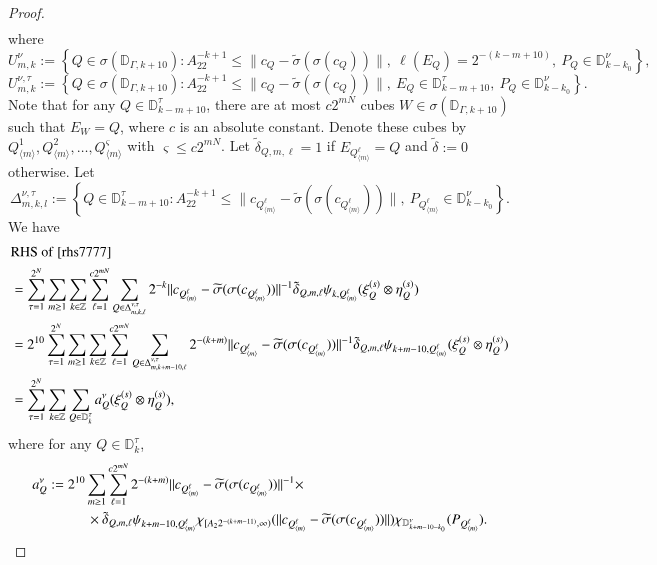 \documentclass[12pt]{amsart}
\begin{document}
\begin{proof}
\begin{align}
\end{align}
where
$$U_{m,k}^\nu:=\left\{Q\in\sigma(\mathbb{D}_{\Gamma,k+10}):A_22^{-k+1}\leq \|c_Q-\widetilde{\sigma}(\sigma(c_Q))\|,\ \ell(E_Q)=2^{-(k-m+10)},\ P_Q\in \mathbb{D}_{k-k_0}^\nu\right\},$$
$$U_{m,k}^{\nu,\tau}:=\left\{Q\in\sigma(\mathbb{D}_{\Gamma,k+10}):A_22^{-k+1}\leq \|c_Q-\widetilde{\sigma}(\sigma(c_Q))\|,\ E_Q\in\mathbb{D}^\tau_{k-m+10},\ P_Q\in \mathbb{D}_{k-k_0}^\nu\right\}.$$
Note that for any $Q\in\mathbb{D}^\tau_{k-m+10}$, there are at most $c2^{mN}$ cubes $W\in\sigma(\mathbb{D}_{\Gamma,k+10})$ such that $E_W=Q$, where $c$ is an absolute constant. Denote these cubes by $Q_{\langle m \rangle}^1, Q_{\langle m\rangle}^2,\ldots,Q_{\langle m\rangle}^\varsigma$ with $\varsigma\leq c2^{mN}$. Let $\tilde{\delta}_{Q,m,\ell}=1$ if $E_{Q_{\langle m\rangle}^\ell}=Q$ and $\tilde{\delta}:=0$ otherwise. Let
$$\Delta_{m,k,l}^{\nu,\tau}:=\left\{Q\in \mathbb{D}_{k-m+10}^\tau: A_22^{-k+1}\leq \|c_{Q_{\langle m\rangle}^\ell}-\widetilde{\sigma}(\sigma(c_{Q_{\langle m\rangle}^\ell}))\|,\ P_{Q_{\langle m\rangle}^\ell}\in \mathbb{D}_{k-k_0}^\nu \right\}.$$
We have
\begin{align}\label{rhs8888}
&{\rm RHS}\ {\rm of}\ \eqref{rhs7777}\nonumber\\
&=\sum_{\tau=1}^{2^N}\sum_{m\geq 1}\sum_{k\in\mathbb{Z}}\sum_{\ell=1}^{c2^{mN}}\sum_{Q\in\Delta_{m,k,\ell}^{\nu,\tau}}2^{-k}\|c_{Q_{\langle m\rangle}^\ell}-\widetilde{\sigma}(\sigma(c_{Q_{\langle m\rangle}^\ell}))\|^{-1}\tilde{\delta}_{Q,m,\ell}\psi_{k,Q_{\langle m \rangle}^\ell}(\xi_{Q}^{(s)}\otimes \eta_{Q}^{(s)})\nonumber\\
&=2^{10}\sum_{\tau=1}^{2^N}\sum_{m\geq 1}\sum_{k\in\mathbb{Z}}\sum_{\ell=1}^{c2^{mN}}\sum_{Q\in\Delta_{m,k+m-10,\ell}^{\nu,\tau}}2^{-(k+m)}\|c_{Q_{\langle m\rangle}^\ell}-\widetilde{\sigma}(\sigma(c_{Q_{\langle m\rangle}^\ell}))\|^{-1}\tilde{\delta}_{Q,m,\ell}\psi_{k+m-10,Q_{\langle m \rangle}^\ell}(\xi_{Q}^{(s)}\otimes \eta_{Q}^{(s)})\nonumber\\
&=\sum_{\tau=1}^{2^N}\sum_{k\in\mathbb{Z}}\sum_{Q\in\mathbb{D}_k^\tau}a_Q^\nu(\xi_{Q}^{(s)}\otimes \eta_{Q}^{(s)}),
\end{align}
where for any $Q\in \mathbb{D}_k^\tau$,
\begin{align*}
  a_Q^\nu&:=2^{10}\sum_{m\geq 1}\sum_{\ell=1}^{c2^{mN}}2^{-(k+m)}\|c_{Q_{\langle m\rangle}^\ell}-\widetilde{\sigma}(\sigma(c_{Q_{\langle m\rangle}^\ell}))\|^{-1}\times\nonumber\\
  &\hspace{1.0cm}\times\tilde{\delta}_{Q,m,\ell}\psi_{k+m-10,Q_{\langle m \rangle}^\ell}\chi_{[A_22^{-(k+m-11)},\infty)}(\|c_{Q_{\langle m\rangle}^\ell}-\widetilde{\sigma}(\sigma(c_{Q_{\langle m\rangle}^\ell}))\|)\chi_{\mathbb{D}_{k+m-10-k_0}^\nu}(P_{Q_{\langle m\rangle}^\ell}).

\end{align*}
\end{proof}
\end{document}
